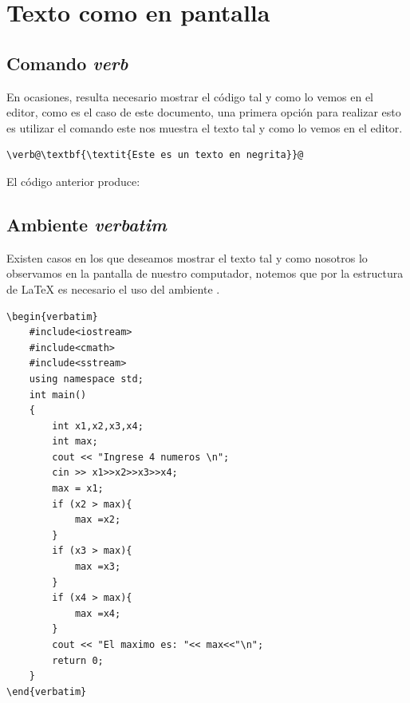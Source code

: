 \documentclass[a4,10pt]{aleph-notas}
\begin{document}
\section{Texto como en pantalla}

\subsection{Comando \emph{verb}}

En ocasiones, resulta necesario mostrar el código tal y como lo vemos en el editor, como es el caso de este documento, una primera opción para realizar esto es utilizar el comando \verb@\verb@ este nos muestra el texto tal y como lo vemos en el editor.

\begin{lstlisting}[frame=single]
\verb@\textbf{\textit{Este es un texto en negrita}}@
\end{lstlisting}

El código anterior produce:

\begin{center}
{ \fboxsep 12pt
 }
\end{center}

\subsection{Ambiente \emph{verbatim}}

Existen casos en los que deseamos mostrar el texto tal y como nosotros lo observamos en la pantalla de nuestro computador, notemos que por la estructura de \LaTeX{} es necesario el uso del ambiente \verb@verbatim@.

\begin{lstlisting}[frame=single]
\begin{verbatim}
    #include<iostream>
    #include<cmath>
    #include<sstream>
    using namespace std;
    int main()
    {       
        int x1,x2,x3,x4;
        int max;
        cout << "Ingrese 4 numeros \n";
        cin >> x1>>x2>>x3>>x4;
        max = x1;
        if (x2 > max){
            max =x2;
        }
        if (x3 > max){
            max =x3;
        }
        if (x4 > max){
            max =x4;
        }
        cout << "El maximo es: "<< max<<"\n";
        return 0;
    }
\end{verbatim}
\end{lstlisting}
\end{document}
